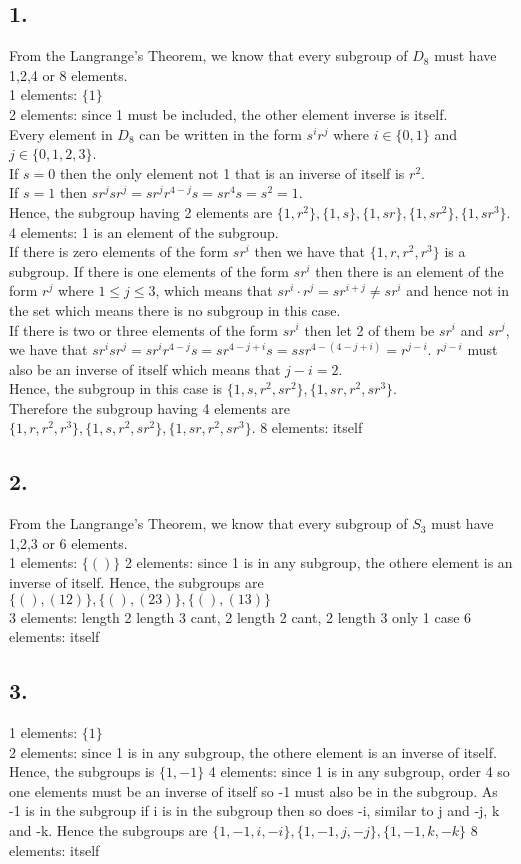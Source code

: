\documentclass[11pt]{article}
\begin{document}
\subsection*{1.}
From the Langrange's Theorem, we know that every subgroup of $D_8$ must have 1,2,4 or 8 elements. \\
1 elements: $\{1\}$ \\
2 elements: since 1 must be included, the other element inverse is itself. \\
Every element in $D_8$ can be written in the form $s^ir^j$ where $i\in \{0,1\}$ and $j \in \{0,1,2,3\}$. \\
If $s=0$ then the only element not 1 that is an inverse of itself is $r^2$. \\
If $s=1$ then $sr^j sr^j = sr^j r^{4-j} s=sr^4s = s^2 = 1$. \\
Hence, the subgroup having 2 elements are $\{1,r^2\}, \{1, s\}, \{1, sr\}, \{1, sr^2\}, \{1,sr^3\}$.
4 elements: 1 is an element of the subgroup. \\
If there is zero elements of the form $sr^i$ then we have that $\{1,r,r^2,r^3\}$ is a subgroup.
If there is one elements of the form $sr^i$ then there is an element of the form $r^j$ where $1\le j \le 3$, which means that $sr^i \cdot r^j = sr^{i+j} \ne sr^i$ and hence not in the set which means there is no subgroup in this case. \\
If there is two or three elements of the form $sr^i$ then let 2 of them be $sr^i$ and $sr^j$, we have that $sr^i sr^j = sr^i r^{4-j} s =sr^{4-j+i}s = ssr^{4-(4-j+i)} = r^{j-i}$. $r^{j-i}$ must also be an inverse of itself which means that $j-i=2$. \\Hence, the subgroup in this case is $\{1, s, r^2, sr^2\}, \{1, sr, r^2, sr^3\}$. \\
Therefore the subgroup having 4 elements are $\{1,r,r^2,r^3\}, \{1, s, r^2, sr^2\}, \{1, sr, r^2, sr^3\}$.
8 elements: itself
\subsection*{2.}
From the Langrange's Theorem, we know that every subgroup of $S_3$ must have 1,2,3 or 6 elements. \\
1 elements: $\{()\}$
2 elements: since 1 is in any subgroup, the othere element is an inverse of itself. Hence, the subgroups are $\{(),(12)\}, \{(),(23)\}, \{(), (13)\}$ \\
3 elements: length 2 length 3 cant, 2 length 2 cant, 2 length 3 only 1 case
6 elements: itself
\subsection*{3.}
1 elements: $\{1\}$ \\
2 elements: since 1 is in any subgroup, the othere element is an inverse of itself. Hence, the subgroups is $\{1,-1\}$
4 elements: since 1 is in any subgroup, order 4 so one elements must be an inverse of itself so -1 must also be in the subgroup. As -1 is in the subgroup if i is in the subgroup then so does -i, similar to j and -j, k and -k. Hence the subgroups are $\{1,-1,i,-i\}, \{1,-1,j,-j\}, \{1,-1, k, -k\}$
8 elements: itself
\end{document}
